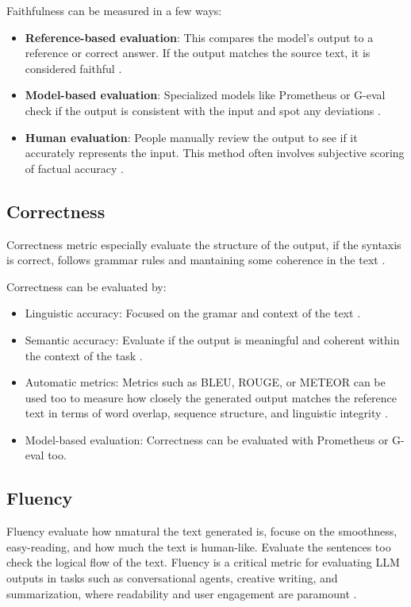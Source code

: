 Faithfulness can be measured in a few ways: 
\begin{itemize}
    \item \textbf{Reference-based evaluation}: This compares the model's output to a reference or correct answer. If the output matches the source text, it is considered faithful \citep{parcalabescu2024measuringfaithfulnessselfconsistencynatural}.  
    \item \textbf{Model-based evaluation}: Specialized models like Prometheus \citep{kim2024prometheus2opensource} or G-eval \cite{liu2023gevalnlgevaluationusing} check if the output is consistent with the input and spot any deviations \citep{gat2023faithfulexplanationsblackboxnlp}.  
    \item \textbf{Human evaluation}: People manually review the output to see if it accurately represents the input. This method often involves subjective scoring of factual accuracy \citep{jacovi-goldberg-2020-towards}.  
\end{itemize}


\subsection{Correctness}
Correctness metric especially evaluate the structure of the output, if the syntaxis is correct, follows grammar rules and mantaining some coherence in the text \citep{varshney-etal-2022-towards}.

Correctness can be evaluated by: 
\begin{itemize} 
    \item Linguistic accuracy: Focused on the gramar and context of the text \citep{varshney-etal-2022-towards}. 
    \item Semantic accuracy: Evaluate if the output is meaningful and coherent within the context of the task \citep{steen2023littlepushnlimodels}. 
    \item Automatic metrics: Metrics such as BLEU, ROUGE, or METEOR can be used too to measure how closely the generated output matches the reference text in terms of word overlap, sequence structure, and linguistic integrity \citep{gat2023faithfulexplanationsblackboxnlp}. 
    \item Model-based evaluation: Correctness can be evaluated with Prometheus or G-eval too\citep{kim2024prometheus2opensource}.\end{itemize}

\subsection{Fluency}
Fluency evaluate how nmatural the text generated is, focuse on the smoothness, easy-reading, and how much the text is human-like. Evaluate the sentences too check the logical flow of the text. Fluency is a critical metric for evaluating LLM outputs in tasks such as conversational agents, creative writing, and summarization, where readability and user engagement are paramount \citep{yin2022sensitivitystabilitymodelinterpretations}.

